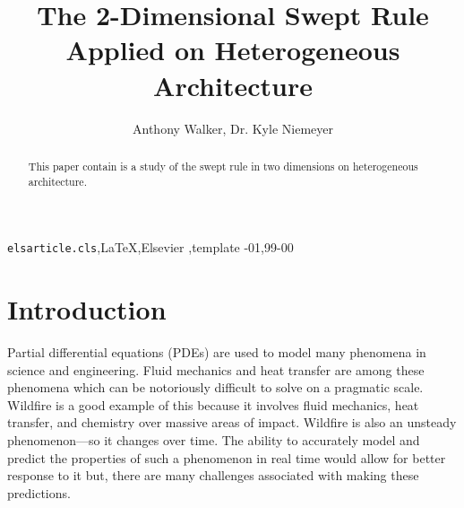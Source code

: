 \documentclass[review]{elsarticle}
\begin{document}
\begin{frontmatter}

\title{The 2-Dimensional Swept Rule Applied on Heterogeneous Architecture}

\author{Anthony Walker, Dr. Kyle Niemeyer}


%



\begin{abstract}
This paper contain is a study of the swept rule in two dimensions on heterogeneous architecture.


\end{abstract}

\begin{keyword}
\texttt{elsarticle.cls}\sep \LaTeX\sep Elsevier \sep template
-01\sep  99-00
\end{keyword}

\end{frontmatter}

\linenumbers

\section{Introduction}
Partial differential equations (PDEs) are used to model many phenomena in science and engineering. Fluid mechanics and heat transfer are among these phenomena which can be notoriously difficult to solve on a pragmatic scale. Wildfire is a good example of this because it involves fluid mechanics, heat transfer, and chemistry over massive areas of impact. Wildfire is also an unsteady phenomenon---so it changes over time. The ability to accurately model and predict the properties of such a phenomenon in real time would allow for better response to it but, there are many challenges associated with making these predictions.
\end{document}
